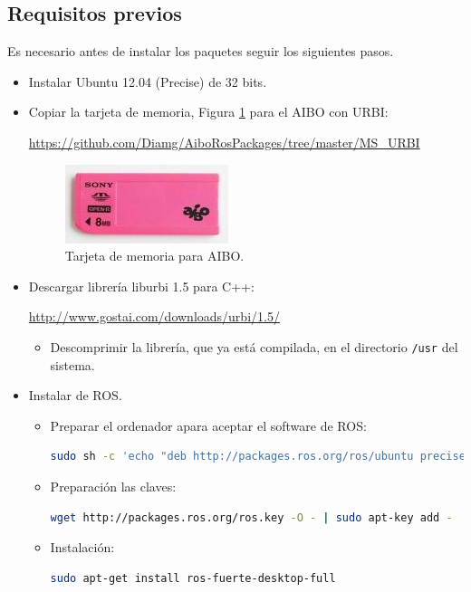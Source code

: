 \documentclass[12pt,a4paper,final,twoside]{article}
\begin{document}
\subsection{Requisitos previos}
Es necesario antes de instalar los paquetes seguir los siguientes pasos.
\begin{itemize}
\item Instalar Ubuntu 12.04 (Precise) de 32 bits.
\item Copiar la tarjeta de memoria, Figura \ref{fig:aiboMS} para el AIBO con URBI:

\url{https://github.com/Diamg/AiboRosPackages/tree/master/MS_URBI}
\begin{figure}[H]
	\centering
    \includegraphics[scale=0.5]{images/MS.jpg}
	 \caption{Tarjeta de memoria para AIBO.}
  \label{fig:aiboMS}
\end{figure}
\item Descargar librería liburbi 1.5 para C++:

\url{http://www.gostai.com/downloads/urbi/1.5/}
\begin{itemize}
\item Descomprimir la librería, que ya está compilada, en el directorio \texttt{/usr} del sistema.
\end{itemize}
\item Instalar de ROS. 

\begin{itemize}
\item Preparar el ordenador apara aceptar el software de ROS:


\begin{lstlisting}[language=bash]
  sudo sh -c 'echo "deb http://packages.ros.org/ros/ubuntu precise main" > /etc/apt/sources.list.d/ros-latest.list'
\end{lstlisting}

\item Preparación las claves:
\begin{lstlisting}[language=bash]
	wget http://packages.ros.org/ros.key -O - | sudo apt-key add -
\end{lstlisting}

\item Instalación:
\begin{lstlisting}[language=bash]
	sudo apt-get install ros-fuerte-desktop-full
\end{lstlisting}


\end{itemize}
\end{itemize}
\end{document}
